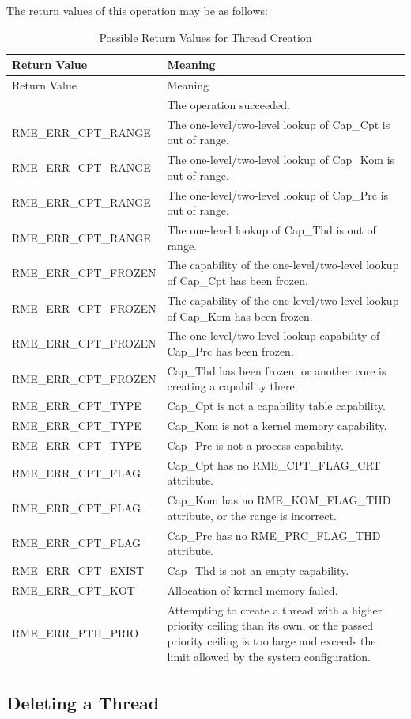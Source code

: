 The return values of this operation may be as follows:

\begin{xltabular}{\textwidth}{@{}>{\hsize\raggedright\arraybackslash}X>{\hsize\raggedright\arraybackslash}X@{}}
\caption{Possible Return Values for Thread Creation}\label{tab:4-21-create-thread-return-values}\\
\toprule
Return Value & Meaning\tabularnewline
\endfirsthead
\toprule
Return Value & Meaning\tabularnewline
\midrule
\endhead
\bottomrule
{} & The operation succeeded.\tabularnewline
    RME\_ERR\_CPT\_RANGE & The one-level/two-level lookup of Cap\_Cpt is out of range.\tabularnewline
    RME\_ERR\_CPT\_RANGE & The one-level/two-level lookup of Cap\_Kom is out of range.\tabularnewline
    RME\_ERR\_CPT\_RANGE & The one-level/two-level lookup of Cap\_Prc is out of range.\tabularnewline
    RME\_ERR\_CPT\_RANGE & The one-level lookup of Cap\_Thd is out of range.\tabularnewline
    RME\_ERR\_CPT\_FROZEN & The capability of the one-level/two-level lookup of Cap\_Cpt has been frozen.\tabularnewline
    RME\_ERR\_CPT\_FROZEN & The capability of the one-level/two-level lookup of Cap\_Kom has been frozen.\tabularnewline
    RME\_ERR\_CPT\_FROZEN & The one-level/two-level lookup capability of Cap\_Prc has been frozen.\tabularnewline
    RME\_ERR\_CPT\_FROZEN & Cap\_Thd has been frozen, or another core is creating a capability there.\tabularnewline
    RME\_ERR\_CPT\_TYPE & Cap\_Cpt is not a capability table capability.\tabularnewline
    RME\_ERR\_CPT\_TYPE & Cap\_Kom is not a kernel memory capability.\tabularnewline
    RME\_ERR\_CPT\_TYPE & Cap\_Prc is not a process capability.\tabularnewline
    RME\_ERR\_CPT\_FLAG & Cap\_Cpt has no RME\_CPT\_FLAG\_CRT attribute.\tabularnewline
    RME\_ERR\_CPT\_FLAG & Cap\_Kom has no RME\_KOM\_FLAG\_THD attribute, or the range is incorrect.\tabularnewline
    RME\_ERR\_CPT\_FLAG & Cap\_Prc has no RME\_PRC\_FLAG\_THD attribute.\tabularnewline
    RME\_ERR\_CPT\_EXIST & Cap\_Thd is not an empty capability.\tabularnewline
    RME\_ERR\_CPT\_KOT & Allocation of kernel memory failed.\tabularnewline
    RME\_ERR\_PTH\_PRIO & Attempting to create a thread with a higher priority ceiling than its own, or the passed priority ceiling is too large and exceeds the limit allowed by the system configuration.\tabularnewline
\bottomrule
\end{xltabular}
\nopagebreak[4]

\subsection{Deleting a Thread}\label{subsec:4-delete-a-thread}
\nopagebreak[4]

